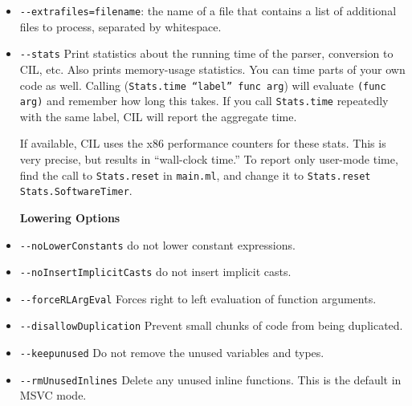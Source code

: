 \documentclass{article}
\def\t#1{{\tt #1}}
\begin{document}
\begin{itemize}
  \item \t{-{}-extrafiles=filename}: the name of a file that contains
    a list of additional files to process, separated by whitespace.
  \item \t{-{}-stats} Print statistics about the running time of the
    parser, conversion to CIL, etc.  Also prints memory-usage
    statistics.  You can time parts of your own code as well.  Calling
    (\t{Stats.time ``label'' func arg}) will evaluate \t{(func arg)}
    and remember how long this takes.  If you call \t{Stats.time}
    repeatedly with the same label, CIL will report the aggregate
    time.

    If available, CIL uses the x86 performance counters for these
    stats.  This is very precise, but results in ``wall-clock time.''
    To report only user-mode time, find the call to \t{Stats.reset} in
    \t{main.ml}, and change it to \t{Stats.reset Stats.SoftwareTimer}.
  
   {\bf Lowering Options}
  \item \t{-{}-noLowerConstants} do not lower constant expressions.
  \item \t{-{}-noInsertImplicitCasts} do not insert implicit casts.
  \item \t{-{}-forceRLArgEval} Forces right to left evaluation of function arguments.
  \item \t{-{}-disallowDuplication} Prevent small chunks of code from being duplicated.
  \item \t{-{}-keepunused} Do not remove the unused variables and types.
  \item \t{-{}-rmUnusedInlines} Delete any unused inline functions.  This is the default in MSVC mode.
   

\end{itemize}
\end{document}
